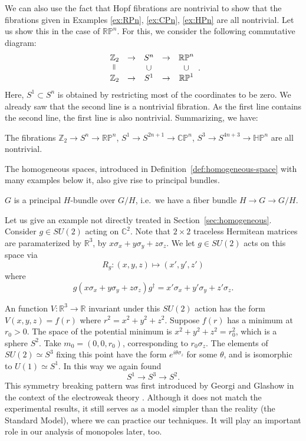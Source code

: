 \documentclass[12pt]{article}
\numberwithin{equation}{section}
\numberwithin{figure}{section}
\theoremstyle{remark}
\def\bC{\mathbb{C}}
\def\bR{\mathbb{R}}
\def\bZ{\mathbb{Z}}
\def\RP{\mathbb{RP}}
\def\CP{\mathbb{CP}}
\def\HP{\mathbb{HP}}
\begin{document}
We can also use the fact that Hopf fibrations are nontrivial to show that
the fibrations given in Examples \ref{ex:RPn}, \ref{ex:CPn}, \ref{ex:HPn} 
are all nontrivial.
Let us show this in the case of $\RP^n$. For this, we consider the following commutative diagram:
\begin{equation}
\begin{array}{ccccc}
  \bZ_2 &\to& S^n &\to& \RP^{n}  \\
   \rotatebox{90}{$=$} & & \cup & & \cup \\
    \bZ_2 &\to& S^1 &\to& \RP^1
\end{array}.
\end{equation}
Here, $S^1\subset S^n$ is obtained by restricting most of the coordinates to be zero.
We already saw that the second line is a nontrivial fibration.
As the first line contains the second line, the first line is also nontrivial.
Summarizing, we have: 
\begin{proposition}
  \label{prop:nontriviality-projective-fibration}
  The fibrations $\bZ_2\to S^n\to \RP^n$,
  $S^1\to S^{2n+1}\to \CP^n$,
  $S^3\to S^{4n+3}\to \HP^n$
  are all nontrivial.
\end{proposition}

The homogeneous spaces, introduced in Definition~\ref{def:homogeneous-space}
with many examples below it,
also give rise to principal bundles.
\begin{proposition}
  $G$ is a principal $H$-bundle over $G/H$, i.e.~we have a fiber bundle $H\to G\to G/H$.
\end{proposition}

Let us give an example not directly treated in Section~\ref{sec:homogeneous}.
Consider $g\in SU(2)$ acting on $\bC^2$.
Note that $2\times 2$ traceless Hermitean matrices are paramaterized by $\bR^3$,
by $x\sigma_x+y\sigma_y+z\sigma_z$.
We let $g\in SU(2)$ acts on this space via \begin{equation}
R_g: (x,y,z) \mapsto (x',y',z')  \label{eq:Rg1}
\end{equation} where \begin{equation}
g(x\sigma_x+y\sigma_y+z\sigma_z)g^\dagger = x'\sigma_x+y'\sigma_y+z'\sigma_z.
\label{eq:Rg2}
\end{equation}

An function $V:\bR^3\to \bR$ invariant under this $SU(2)$ action 
has the form $V(x,y,z)=f(r)$ where $r^2={x^2+y^2+z^2}$.
Suppose $f(r)$ has a minimum at $r_0>0$.
The space of the potential minimum is $x^2+y^2+z^2=r_0^2$, which is a sphere $S^2$.
Take $m_0=(0,0,r_0)$, corresponding to $r_0 \sigma_z$.
The elements of $SU(2)\simeq S^3$ fixing this point have the form $e^{i\theta \sigma_z}$ for some $\theta$,
and is isomorphic to $U(1)\simeq S^1$.
In this way we again found \begin{equation}
  S^1 \to S^3 \to S^2.
\end{equation}
This symmetry breaking pattern was first introduced by Georgi and Glashow in the context of the electroweak theory \cite{Georgi:1972cj}.
Although it does not match the experimental results,
it still serves as a model simpler than the reality (the Standard Model),
where we can practice our techniques. 
It will play an important role in our analysis of monopoles later, too.
\end{document}

